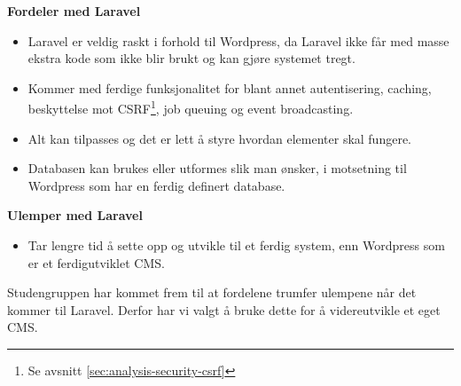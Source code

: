 \textbf{Fordeler med Laravel}
\begin{itemize}
    \item Laravel er veldig raskt i forhold til Wordpress, da Laravel ikke får med masse ekstra kode som ikke blir brukt og kan gjøre systemet tregt.
    \item Kommer med ferdige funksjonalitet for blant annet autentisering, caching, beskyttelse mot CSRF\footnote{Se avsnitt \ref{sec:analysis-security-csrf}}, job queuing og event broadcasting.
    \item Alt kan tilpasses og det er lett å styre hvordan elementer skal fungere.
    \item Databasen kan brukes eller utformes slik man ønsker, i motsetning til Wordpress som har en ferdig definert database.
\end{itemize}

\textbf{Ulemper med Laravel}
\begin{itemize}
    \item Tar lengre tid å sette opp og utvikle til et ferdig system, enn Wordpress som er et ferdigutviklet CMS.
\end{itemize}

Studengruppen har kommet frem til at fordelene trumfer ulempene når det kommer til Laravel. Derfor har vi valgt å bruke dette for å videreutvikle et eget CMS.







